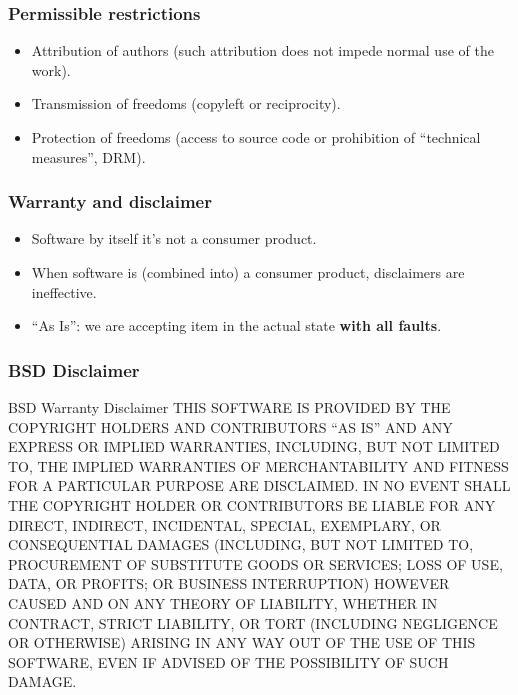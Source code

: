 \begin{frame}
\frametitle{Permissible restrictions}
\begin{itemize}
    \item Attribution of authors (such attribution does not impede normal use of the work).
    \item Transmission of freedoms (copyleft or reciprocity).
    \item Protection of freedoms (access to source code or prohibition of ``technical measures'', DRM). 
\end{itemize}

\end{frame}

\begin{frame}
\frametitle{Warranty and disclaimer}
\begin{itemize}
    \item Software by itself it's not a consumer product.
    \item When software is (combined into) a consumer product, disclaimers are ineffective.
    \item ``As Is'': we are accepting item in the actual state \textbf{with all faults}.
\end{itemize}

\end{frame}
 
\begin{frame}
\frametitle{BSD Disclaimer}

\begin{block}{BSD Warranty Disclaimer}
\small{THIS SOFTWARE IS PROVIDED BY THE COPYRIGHT HOLDERS AND CONTRIBUTORS ``AS IS'' AND ANY EXPRESS OR IMPLIED WARRANTIES, INCLUDING, BUT NOT LIMITED TO, THE IMPLIED WARRANTIES OF MERCHANTABILITY AND FITNESS FOR A PARTICULAR PURPOSE ARE DISCLAIMED. IN NO EVENT SHALL THE COPYRIGHT HOLDER OR CONTRIBUTORS BE LIABLE FOR ANY DIRECT, INDIRECT, INCIDENTAL, SPECIAL, EXEMPLARY, OR CONSEQUENTIAL DAMAGES (INCLUDING, BUT NOT LIMITED TO, PROCUREMENT OF SUBSTITUTE GOODS OR SERVICES; LOSS OF USE, DATA, OR PROFITS; OR BUSINESS INTERRUPTION) HOWEVER CAUSED AND ON ANY THEORY OF LIABILITY, WHETHER IN CONTRACT, STRICT LIABILITY, OR TORT (INCLUDING NEGLIGENCE OR OTHERWISE) ARISING IN ANY WAY OUT OF THE USE OF THIS SOFTWARE, EVEN IF ADVISED OF THE POSSIBILITY OF SUCH DAMAGE.}
\end{block}

\end{frame}



